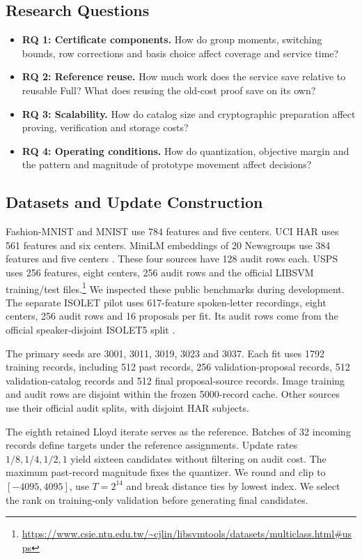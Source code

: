 \documentclass[5p,times,twocolumn]{elsarticle}
\begin{document}
\subsection{Research Questions}
\begin{itemize}[leftmargin=*]
\item \textbf{RQ 1: Certificate components.} How do group moments, switching
bounds, row corrections and basis choice affect coverage and service time?
\item \textbf{RQ 2: Reference reuse.} How much work does the service save
relative to reusable Full? What does reusing the old-cost proof save on its own?
\item \textbf{RQ 3: Scalability.} How do catalog size and cryptographic
preparation affect proving, verification and storage costs?
\item \textbf{RQ 4: Operating conditions.} How do quantization, objective
margin and the pattern and magnitude of prototype movement affect decisions?
\end{itemize}

\subsection{Datasets and Update Construction}
Fashion-MNIST and MNIST use 784 features and five centers. UCI HAR uses
561 features and six centers. MiniLM embeddings of 20 Newsgroups use
384 features and five centers
\cite{fashion2017,lecun1998,ucihar2012,news20data,minilmcard2026}.
These four sources have 128 audit rows each. USPS uses 256 features,
eight centers, 256 audit rows and the official LIBSVM training/test
files.\footnote{\url{https://www.csie.ntu.edu.tw/~cjlin/libsvmtools/datasets/multiclass.html\#usps}}
We inspected these public benchmarks during development. The separate
ISOLET pilot uses 617-feature spoken-letter recordings, eight centers,
256 audit rows and 16 proposals per fit. Its audit rows come from the
official speaker-disjoint ISOLET5 split \cite{isolet1991}.

The primary seeds are 3001, 3011, 3019, 3023 and 3037. Each fit uses 1792
training records, including 512 past records,
256 validation-proposal records, 512 validation-catalog records and
512 final proposal-source records. Image training and audit rows are disjoint within the frozen
5000-record cache. Other
sources use their official audit splits, with disjoint HAR subjects.

The eighth retained Lloyd iterate serves as the reference. Batches of 32
incoming records define targets under the reference assignments.
Update rates $1/8,1/4,1/2,1$ yield sixteen candidates without filtering
on audit cost. The maximum past-record magnitude fixes the quantizer.
We round and clip to $[-4095,4095]$, use $T=2^{14}$ and break distance
ties by lowest index. We select the rank on training-only validation
before generating final candidates.
\end{document}
